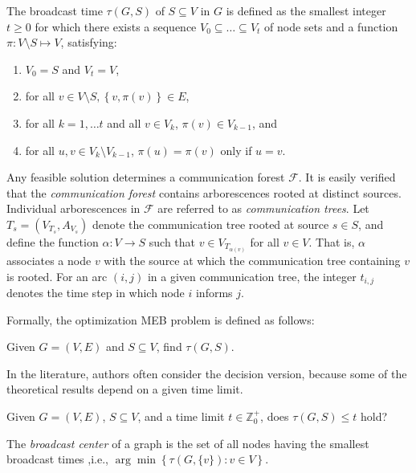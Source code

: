 \begin{definition}\label{def:mbt}
The broadcast time $\tau(G,S)$ of $S\subseteq V$ in $G$ is defined as the smallest integer $t\geq 0$
for which there exists a sequence $V_0\subseteq\dots\subseteq V_t$ of node sets and a function $\pi:V\setminus S\mapsto V$, satisfying:
\begin{enumerate}
\item $V_0=S$ and $V_t=V$,
\item for all $v\in V\setminus S, \left\{v,\pi(v)\right\}\in E$,
\item for all $k=1,\dots t$ and all $v\in V_k$, $\pi(v)\in V_{k-1}$, and
\item for all $u,v\in V_k\setminus V_{k-1}$, $\pi(u)=\pi(v)$ only if $u=v$.
\end{enumerate}
\end{definition}
Any feasible solution determines a communication forest $\mathcal{F}$.
It is easily verified that the \emph{communication forest} contains arborescences rooted at distinct sources.
Individual arborescences in $\mathcal{F}$ are referred to as \emph{communication trees}.
Let $T_s=\left(V_{T_s},A_{V_s}\right)$ denote the communication tree rooted at source $s\in S$, and define the function $\alpha:V\to S$ such that $v\in V_{T_{\alpha(v)}}$ for all $v\in V$.
That is, $\alpha$ associates a node $v$ with the source at which the communication tree containing $v$ is rooted.
For an arc $(i,j)$ in a given communication tree, the integer $t_{i,j}$ denotes the time step in which node $i$ informs $j$.

Formally, the optimization MEB problem is defined as follows:
\begin{problem}\label{mbt:opt}
Given $G=(V,E)$ and $S\subseteq V$, find $\tau(G,S)$. 
\end{problem}
In the literature, authors often consider the decision version, because some of the theoretical results depend on a given time limit.
\begin{problem}\label{mbt:dec}
Given $G=(V,E)$, $S\subseteq V$,  and a time limit $t\in \mathbb{Z}^+_0$, does $\tau(G,S)\leq t$ hold? 
\end{problem}

The \emph{broadcast center} of a graph is the set of all nodes having the smallest broadcast times ,i.e., $\arg\min\left\{\tau(G,\{v\}):v\in V\right\}$.


